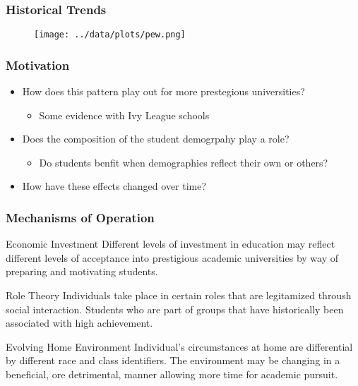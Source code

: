 \documentclass{beamer}
\begin{document}

\begin{frame}
\frametitle{Historical Trends}
\begin{figure}
\texttt{[image: ../data/plots/pew.png]}
\end{figure}
\end{frame}


\begin{frame}
\frametitle{Motivation}
\begin{itemize}
  \item How does this pattern play out for more prestegious universities?
  \begin{itemize}
    \item Some evidence with Ivy League schools
  \end{itemize}
  \item Does the composition of the student demogrpahy play a role?
  \begin{itemize}
    \item Do students benfit when demographies reflect their own or others?
  \end{itemize}
  \item How have these effects changed over time?
\end{itemize}
\end{frame}


\begin{frame}
\frametitle{Mechanisms of Operation}
\begin{block}{Economic Investment}
Different levels of investment in education may reflect different levels of
acceptance into prestigious academic universities by way of preparing and
motivating students.
\end{block}

\begin{block}{Role Theory}
Individuals take place in certain roles that are legitamized throush social
interaction. Students who are part of groups that have historically been
associated with high achievement.
\end{block}

\begin{block}{Evolving Home Environment}
Individual's circumstances at home are differential by different race and class
identifiers. The environment may be changing in a beneficial, ore detrimental,
manner allowing more time for academic pursuit.
\end{block}
\end{frame}
\end{document}
